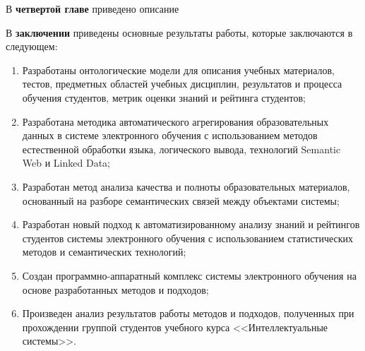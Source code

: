В \textbf{четвертой главе} приведено описание 

В \textbf{заключении} приведены основные результаты работы, которые заключаются в следующем:
\begin{enumerate}
 \item Разработаны онтологические модели для описания учебных материалов, тестов, предметных областей учебных дисциплин, результатов и процесса обучения студентов, метрик оценки знаний и рейтинга студентов;
 \item Разработана методика автоматического агрегирования образовательных данных в системе электронного обучения с использованием методов естественной обработки языка, логического вывода, технологий Semantic Web и Linked Data;
 \item Разработан метод анализа качества и полноты образовательных материалов, основанный на разборе семантических связей между объектами системы;
  \item Разработан новый подход к автоматизированному анализу знаний и рейтингов студентов системы электронного обучения с использованием статистических методов и семантических технологий;
  \item Создан программно-аппаратный комплекс системы электронного обучения на основе разработанных методов и подходов;
  \item Произведен анализ результатов работы методов и подходов, полученных при прохождении группой студентов учебного курса <<Интеллектуальные системы>>.
  \end{enumerate}


\renewcommand{\refname}{\Large Публикации автора по теме диссертации}
\nocite{*}
